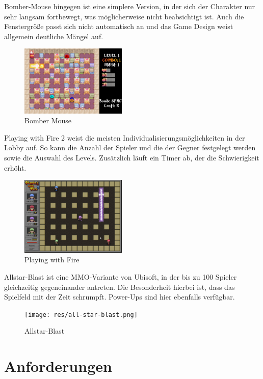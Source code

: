 \documentclass[conference]{IEEEtran}
\begin{document}
Bomber-Mouse \cite{bombermouse} hingegen ist eine simplere Version, in der sich der Charakter nur sehr langsam fortbewegt, was möglicherweise nicht beabsichtigt ist. Auch die Fenstergröße passt sich nicht automatisch an und das Game Design weist allgemein deutliche Mängel auf.
\begin{figure}[H]
    \centering
    \includegraphics[width=0.45\textwidth]{res/bombermouse.png}
    \caption{Bomber Mouse}
\end{figure}
Playing with Fire 2 \cite{playingwithfire} weist die meisten Individualisierungsmöglichkeiten in der Lobby auf. So kann die Anzahl der Spieler und die der Gegner festgelegt werden sowie die Auswahl des Levels. Zusätzlich läuft ein Timer ab, der die Schwierigkeit erhöht. 
\begin{figure}[H]
    \centering
    \includegraphics[width=0.45\textwidth]{res/playing-with-fire.png}
    \caption{Playing with Fire}
\end{figure}


Allstar-Blast \cite{allstarblast} ist eine MMO-Variante von Ubisoft, in der bis zu 100 Spieler gleichzeitig gegeneinander antreten. Die Besonderheit hierbei ist, dass das Spielfeld mit der Zeit schrumpft. Power-Ups sind hier ebenfalls verfügbar.
\begin{figure}[H]
    \centering
    \texttt{[image: res/all-star-blast.png]}
    \caption{Allstar-Blast}
\end{figure}


\section{Anforderungen}
\end{document}
